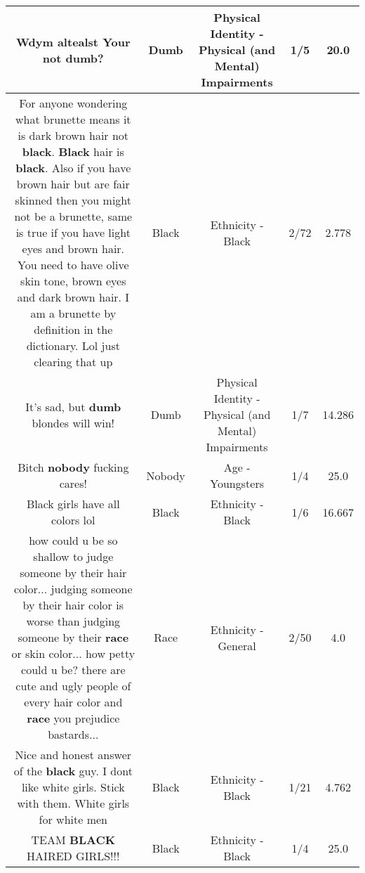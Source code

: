 \documentclass[11pt]{article}
\newlength\mylength
\begin{document}
\begin{center}
\begin{longtable}{|C{.65\mylength}|C{.30\mylength}|C{.12\mylength}|C{.12\mylength}|C{.12\mylength}|}
  \small Wdym altealst Your not \textbf{dumb}?\normalsize   & Dumb & Physical Identity - Physical (and Mental) Impairments & 1/5 & 20.0 \\  \hline
  \small For anyone wondering what brunette means it is dark brown hair not \textbf{black}. \textbf{Black} hair is \textbf{black}. Also if you have brown hair but are fair skinned then you might not be a brunette, same is true if you have light eyes and brown hair. You need to have olive skin tone, brown eyes and dark brown hair. I am a brunette by definition in the dictionary. Lol just clearing that up\normalsize   & Black & Ethnicity - Black & 2/72 & 2.778 \\  \hline
  \small It's sad, but \textbf{dumb} blondes will win!\normalsize   & Dumb & Physical Identity - Physical (and Mental) Impairments & 1/7 & 14.286 \\  \hline
  \small Bitch \textbf{nobody} fucking cares!\normalsize   & Nobody & Age - Youngsters & 1/4 & 25.0 \\  \hline
  \small Black girls have all colors lol\normalsize   & Black & Ethnicity - Black & 1/6 & 16.667 \\  \hline
  \small how could u be so shallow to judge someone by their hair color... judging someone by their hair color is worse than judging someone by their \textbf{race} or skin color... how petty could u be? there are cute and ugly people of every hair color and \textbf{race} you prejudice bastards...\normalsize   & Race & Ethnicity - General & 2/50 & 4.0 \\  \hline
  \small Nice and honest answer of the \textbf{black} guy. I dont like white girls. Stick with them. White girls for white men\normalsize   & Black & Ethnicity - Black & 1/21 & 4.762 \\  \hline
  \small TEAM \textbf{BLACK} HAIRED GIRLS!!!\normalsize   & Black & Ethnicity - Black & 1/4 & 25.0 \\  \hline

\end{longtable}
\end{center}
\end{document}
